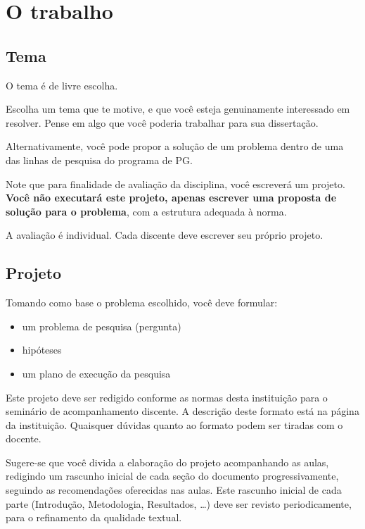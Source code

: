 \documentclass[a4paper]{article}
\begin{document}
\section{O trabalho}

\subsection{Tema}

O tema é de livre escolha.

Escolha um tema que te motive, e que você esteja genuinamente interessado em resolver.
Pense em algo que você poderia trabalhar para sua dissertação.

Alternativamente, você pode propor a solução de um problema dentro de uma das linhas de pesquisa do programa de PG.

Note que para finalidade de avaliação da disciplina, você escreverá um projeto. {\bf Você não executará este projeto, apenas escrever uma proposta de solução para o problema}, com a estrutura adequada à norma.

A avaliação é individual. Cada discente deve escrever seu próprio projeto.

\subsection{Projeto}

Tomando como base o problema escolhido, você deve formular:

\begin{itemize}
\item um problema de pesquisa (pergunta)
\item hipóteses
\item um plano de execução da pesquisa
\end{itemize}

Este projeto deve ser redigido conforme as normas desta instituição
para o seminário de acompanhamento discente. A
descrição deste formato está na página da instituição. Quaisquer
dúvidas quanto ao formato podem ser tiradas com o docente.

Sugere-se que você divida a elaboração do projeto acompanhando
as aulas, redigindo um rascunho inicial de cada seção do documento
progressivamente, seguindo as recomendações oferecidas nas aulas. Este
rascunho inicial de cada parte (Introdução, Metodologia, Resultados,
\ldots) deve ser revisto periodicamente, para o refinamento da
qualidade textual.

\end{document}
